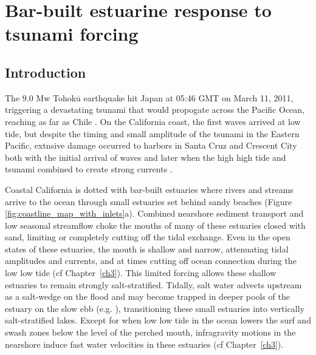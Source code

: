 \chapter{Bar-built estuarine response to tsunami forcing}
\label{chTsunami}




\section{Introduction}

The 9.0 Mw Tohok$\overline{\mathrm{u}}$ earthquake hit Japan at 05:46 GMT on March 11, 2011,
triggering a devastating tsunami that would propogate across the Pacific
Ocean, reaching as far as Chile \parencite{mori_survey_2011,lagos_magnitude_2011}. On the California coast, the first waves arrived at low tide, but despite
the timing and small amplitude of the tsunami in the Eastern Pacific,
extnsive damage occurred to harbors in Santa Cruz and Crescent City
both with the initial arrival of waves and later when the high high
tide and tsunami combined to create strong currents \parencite{wilson_observations_2012}.

Coastal California is dotted with bar-built estuaries where rivers
and streams arrive to the ocean through small estuaries set behind
sandy beaches (Figure \ref{fig:coastline_map_with_inlets}a). Combined
nearshore sediment transport and low seasonal streamflow choke the
mouths of many of these estuaries closed with sand, limiting or completely
cutting off the tidal exchange. Even in the open states of these estuaries,
the mouth is shallow and narrow, attenuating tidal amplitudes and
currents, and at times cutting off ocean connection during the low low
tide (cf Chapter~\ref{ch3}). This limited forcing allows
these shallow estuaries to remain strongly salt-stratified. Tidally,
salt water advects upstream as a salt-wedge on the flood and may become
trapped in deeper pools of the estuary on the slow ebb (e.g. \cite{largier_dynamics_1991,ranasinghe_circulation_1999}),
transitioning these small estuaries into vertically salt-stratified
lakes. Except for when low low tide in the ocean lowers the surf and
swash zones below the level of the perched mouth, infragravity motions
in the nearshore induce fast water velocities in these estuaries (cf Chapter~\ref{ch3}). 



